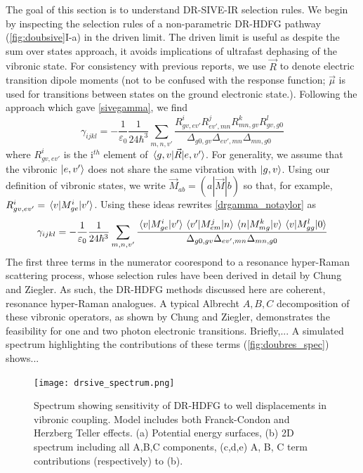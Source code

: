 \documentclass[aip, jcp, reprint, onecolumn]{revtex4-2}
\begin{document}
The goal of this section is to understand DR-SIVE-IR selection rules.
We begin by inspecting the selection rules of a non-parametric DR-HDFG pathway (\autoref{fig:doubsive}I-a) in the driven limit. 
The driven limit is useful as despite the sum over states approach, it avoids implications of ultrafast dephasing of the vibronic state.\cite{Cho2001} 
For consistency with previous reports, we use $\vec{R}$ to denote electric transition dipole moments (not to be confused with the response function; $\vec{\mu}$ is used for transitions between states on the ground electronic state.). \cite{Ziegler1974}
Following the approach which gave \autoref{sivegamma}, we find
\begin{equation}\label{drgamma_notaylor}
	\gamma_{ijkl} = -\frac{1}{\varepsilon_0} \frac{1}{24 \hbar^3} \sum_{m,n,v'} \frac{
		R^{i}_{gv,ev'} 
		R^{j}_{ev',mn} 
		R^{k}_{mn,gv} 
		R^{l}_{gv,g0} 
	}{\Delta_{g0,gv}
		\Delta_{ev', mn}
		\Delta_{mn, g0}
	}
\end{equation}
where $R^{i}_{gv,ev'}$ is the i$^{th}$ element of $\mel{g,v}{\vec{R}}{e,v'}$.
For generality, we assume that the vibronic  $\ket{e,v'}$ does not share the same vibration with $\ket{g,v}$. \cite{Ziegler1988}
Using our definition of vibronic states, we write $\vec{M}_{ab} = (a|\vec{M}|b)$ so that, for example,
$R^{i}_{gv,ev'} = \mel{v}{M^i_{ge}}{v'}$.\cite{Albrecht1960}
Using these ideas rewrites \autoref{drgamma_notaylor} as
\begin{equation}\label{drgamma_notaylor_1}
	\gamma_{ijkl} = -\frac{1}{\varepsilon_0} \frac{1}{24 \hbar^3} \sum_{m,n,v'} \frac{
		\mel{v}{M^{i}_{ge}}{v'} 
		\mel{v'}{M^{j}_{em}}{n}
		\mel{n}{M^{k}_{mg} }{v}
		\mel{v}{M^{l}_{gg}}{0}
	}{\Delta_{g0,gv}
		\Delta_{ev', mn}
		\Delta_{mn, g0}	}
\end{equation}
The first three terms in the numerator coorespond to a resonance hyper-Raman scattering process, whose selection rules have been derived in detail by Chung and Ziegler. \cite{Ziegler1988}
As such, the DR-HDFG methods discussed here are coherent, resonance hyper-Raman analogues. 
A typical Albrecht $A,B,C$ decomposition of these vibronic operators, as shown by Chung and Ziegler, demonstrates the feasibility for one and two photon electronic transitions.
Briefly,... %
A simulated spectrum highlighting the contributions of these terms (\autoref{fig:doubres_spec}) shows...
\begin{figure}[!htbp]
	\centering
	\texttt{[image: drsive\_spectrum.png]}
	\caption{Spectrum showing sensitivity of DR-HDFG to well displacements in vibronic coupling.
		Model includes both Franck-Condon and Herzberg Teller effects.
		(a) Potential energy surfaces, (b) 2D spectrum including all A,B,C components, (c,d,e) A, B, C term contributions (respectively) to (b).}
	\label{fig:doubres_spec}
\end{figure}
\end{document}
